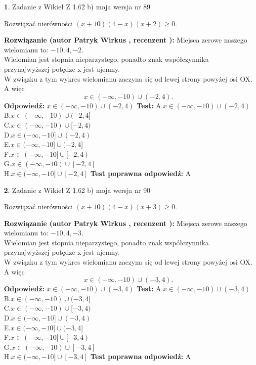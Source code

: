 \documentclass[12pt, a4paper]{article}
\theoremstyle{definition} %
\newtheorem{zad}{}
\newcommand{\zadStart}[1]{\begin{zad}#1\newline}
\newcommand{\zadStop}{\end{zad}}
\newcommand{\rozwStart}[2]{\noindent \textbf{Rozwiązanie (autor #1 , recenzent #2): }\newline}
\newcommand{\rozwStop}{\newline}
\newcommand{\odpStart}{\noindent \textbf{Odpowiedź:}\newline}
\newcommand{\odpStop}{\newline}
\newcommand{\testStart}{\noindent \textbf{Test:}\newline}
\newcommand{\testStop}{\newline}
\newcommand{\kluczStart}{\noindent \textbf{Test poprawna odpowiedź:}\newline}
\newcommand{\kluczStop}{\newline}
\begin{document}
\zadStart{Zadanie z Wikieł Z 1.62 b) moja wersja nr 89}

Rozwiązać nierówności $(x+10)(4-x)(x+2)\ge0$.
\zadStop
\rozwStart{Patryk Wirkus}{}
Miejsca zerowe naszego wielomianu to: $-10, 4, -2$.\\
Wielomian jest stopnia nieparzystego, ponadto znak współczynnika przy\linebreak najwyższej potędze x jest ujemny.\\ W związku z tym wykres wielomianu zaczyna się od lewej strony powyżej osi OX. A więc $$x \in (-\infty,-10) \cup (-2,4).$$
\rozwStop
\odpStart
$x \in (-\infty,-10) \cup (-2,4)$
\odpStop
\testStart
A.$x \in (-\infty,-10) \cup (-2,4)$\\
B.$x \in (-\infty,-10) \cup (-2,4]$\\
C.$x \in (-\infty,-10) \cup [-2,4)$\\
D.$x \in (-\infty,-10] \cup (-2,4)$\\
E.$x \in (-\infty,-10] \cup (-2,4]$\\
F.$x \in (-\infty,-10] \cup [-2,4)$\\
G.$x \in (-\infty,-10) \cup [-2,4]$\\
H.$x \in (-\infty,-10] \cup [-2,4]$
\testStop
\kluczStart
A
\kluczStop



\zadStart{Zadanie z Wikieł Z 1.62 b) moja wersja nr 90}

Rozwiązać nierówności $(x+10)(4-x)(x+3)\ge0$.
\zadStop
\rozwStart{Patryk Wirkus}{}
Miejsca zerowe naszego wielomianu to: $-10, 4, -3$.\\
Wielomian jest stopnia nieparzystego, ponadto znak współczynnika przy\linebreak najwyższej potędze x jest ujemny.\\ W związku z tym wykres wielomianu zaczyna się od lewej strony powyżej osi OX. A więc $$x \in (-\infty,-10) \cup (-3,4).$$
\rozwStop
\odpStart
$x \in (-\infty,-10) \cup (-3,4)$
\odpStop
\testStart
A.$x \in (-\infty,-10) \cup (-3,4)$\\
B.$x \in (-\infty,-10) \cup (-3,4]$\\
C.$x \in (-\infty,-10) \cup [-3,4)$\\
D.$x \in (-\infty,-10] \cup (-3,4)$\\
E.$x \in (-\infty,-10] \cup (-3,4]$\\
F.$x \in (-\infty,-10] \cup [-3,4)$\\
G.$x \in (-\infty,-10) \cup [-3,4]$\\
H.$x \in (-\infty,-10] \cup [-3,4]$
\testStop
\kluczStart
A
\kluczStop
\end{document}
